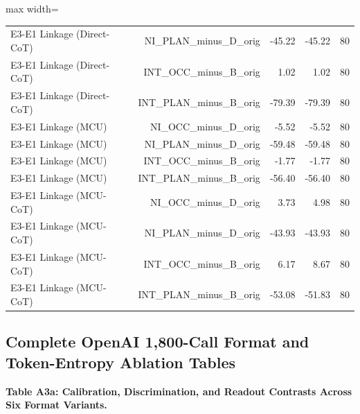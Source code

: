 \documentclass[11pt,a4paper]{article}
\begin{document}
\begin{center}
\begin{adjustbox}{max width=\textwidth}
\begin{tabular}{lrrrr}
E3-E1 Linkage (Direct-CoT) & NI\_\allowbreak{}PLAN\_\allowbreak{}minus\_\allowbreak{}D\_\allowbreak{}orig & -45.22 & -45.22 & 80 \\
E3-E1 Linkage (Direct-CoT) & INT\_\allowbreak{}OCC\_\allowbreak{}minus\_\allowbreak{}B\_\allowbreak{}orig & 1.02 & 1.02 & 80 \\
E3-E1 Linkage (Direct-CoT) & INT\_\allowbreak{}PLAN\_\allowbreak{}minus\_\allowbreak{}B\_\allowbreak{}orig & -79.39 & -79.39 & 80 \\
E3-E1 Linkage (MCU) & NI\_\allowbreak{}OCC\_\allowbreak{}minus\_\allowbreak{}D\_\allowbreak{}orig & -5.52 & -5.52 & 80 \\
E3-E1 Linkage (MCU) & NI\_\allowbreak{}PLAN\_\allowbreak{}minus\_\allowbreak{}D\_\allowbreak{}orig & -59.48 & -59.48 & 80 \\
E3-E1 Linkage (MCU) & INT\_\allowbreak{}OCC\_\allowbreak{}minus\_\allowbreak{}B\_\allowbreak{}orig & -1.77 & -1.77 & 80 \\
E3-E1 Linkage (MCU) & INT\_\allowbreak{}PLAN\_\allowbreak{}minus\_\allowbreak{}B\_\allowbreak{}orig & -56.40 & -56.40 & 80 \\
E3-E1 Linkage (MCU-CoT) & NI\_\allowbreak{}OCC\_\allowbreak{}minus\_\allowbreak{}D\_\allowbreak{}orig & 3.73 & 4.98 & 80 \\
E3-E1 Linkage (MCU-CoT) & NI\_\allowbreak{}PLAN\_\allowbreak{}minus\_\allowbreak{}D\_\allowbreak{}orig & -43.93 & -43.93 & 80 \\
E3-E1 Linkage (MCU-CoT) & INT\_\allowbreak{}OCC\_\allowbreak{}minus\_\allowbreak{}B\_\allowbreak{}orig & 6.17 & 8.67 & 80 \\
E3-E1 Linkage (MCU-CoT) & INT\_\allowbreak{}PLAN\_\allowbreak{}minus\_\allowbreak{}B\_\allowbreak{}orig & -53.08 & -51.83 & 80 \\
\bottomrule\end{tabular}\end{adjustbox}\endgroup\end{center}

\subsection{Complete OpenAI 1,800-Call Format and Token-Entropy Ablation Tables}

\textbf{Table A3a: Calibration, Discrimination, and Readout Contrasts Across Six Format Variants.}
\end{document}
